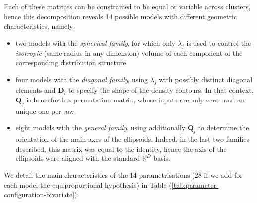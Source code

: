 Each of these matrices can be constrained to be equal or variable across clusters, hence this decomposition reveals 14 possible models with different geometric characteristics, namely:

\begin{itemize}
\item
  two models with the \emph{spherical family}, for which only \(\lambda_j\) is used to control the \emph{isotropic} (same radius in any dimension) volume of each component of the corresponding distribution structure
\item
  four models with the \emph{diagonal family}, using \(\lambda_j\) with possibly distinct diagonal elements and \(\boldsymbol{D}_j\) to specify the shape of the density contours. In that context, \(\boldsymbol{Q}_j\) is henceforth a permutation matrix, whose inputs are only zeros and an unique one per row.
\item
  eight models with the \emph{general family}, using additionally \(\boldsymbol{Q}_j\) to determine the orientation of the main axes of the ellipsoids. Indeed, in the last two families described, this matrix was equal to the identity, hence the axis of the ellipsoids were aligned with the standard \(\mathbb{R}^D\) basis.
\end{itemize}

We detail the main characteristics of the 14 parametrisations (28 if we add for each model the equiproportional hypothesis) in Table (\ref{tab:parameter-configuration-bivariate}):


